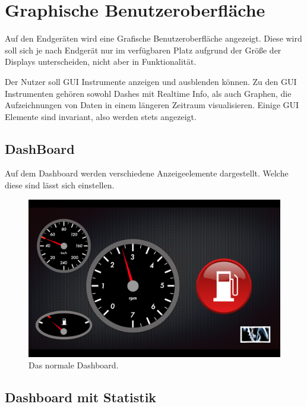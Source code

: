 \documentclass[pflichtenheft.tex]{subfiles}
\begin{document}
\chapter{Graphische Benutzeroberfläche}
Auf den Endgeräten wird eine Grafische Benutzeroberfläche angezeigt. Diese wird soll sich je nach Endgerät nur im verfügbaren Platz aufgrund der Größe der Displays unterscheiden, nicht aber in Funktionalität.

Der Nutzer soll GUI Instrumente anzeigen und ausblenden können. Zu den GUI Instrumenten gehören sowohl Dashes mit Realtime Info, als auch Graphen, die Aufzeichnungen von Daten in einem längeren Zeitraum visualisieren. Einige GUI Elemente sind invariant, also werden stets angezeigt.


\section{DashBoard}

Auf dem Dashboard werden verschiedene Anzeigeelemente dargestellt. Welche diese sind lässt sich einstellen. 

\begin{figure}[h]
  	\begin{center}
 		\includegraphics[width=\textwidth]{Images/GUI-Dash.png}
  		\caption{Das normale Dashboard.}
  	\end{center}
\end{figure}


\section{Dashboard mit Statistik}
\end{document}
